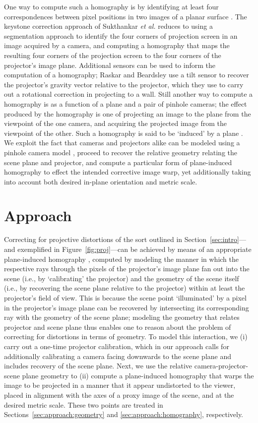 \documentclass[review]{elsarticle}
\begin{document}
One way to compute such a homography is by identifying at least four correspondences between pixel positions in two images of a planar surface \cite{Hartley2004}. The keystone correction approach of Sukthankar \textit{et al.} \cite{sukthankar2001smarter} reduces to using a segmentation approach to identify the four corners of projection screen in an image acquired by a camera, and computing a homography that maps the resulting four corners of the projection screen to the four corners of the projector's image plane. Additional sensors can be used to inform the computation of a homography; Raskar and Beardsley \cite{raskar2001self} use a tilt sensor to recover the projector's gravity vector relative to the projector, which they use to carry out a rotational correction in projecting to a wall. Still another way to compute a homography is as a function of a plane and a pair of pinhole cameras; the effect produced by the homography is one of projecting an image to the plane from the viewpoint of the one camera, and acquiring the projected image from the viewpoint of the other. Such a homography is said to be `induced' by a plane \cite{Hartley2004}. We exploit the fact that cameras and projectors alike can be modeled using a pinhole camera model \cite{bimber2019spatial}, proceed to recover the relative geometry relating the scene plane and projector, and compute a particular form of plane-induced homography to effect the intended corrective image warp, yet additionally taking into account both desired in-plane orientation and metric scale.

\section{Approach}

Correcting for projective distortions of the sort outlined in Section~\ref{sec:intro}---and exemplified in Figure~\ref{fig:proj}---can be achieved by means of an appropriate plane-induced homography \cite{Hartley2004}, computed by modeling the manner in which the respective rays through the pixels of the projector's image plane fan out into the scene (i.e., by `calibrating' the projector) and the geometry of the scene itself (i.e., by recovering the scene plane relative to the projector) within at least the projector's field of view. This is because the scene point `illuminated' by a pixel in the projector's image plane can be recovered by intersecting its corresponding ray with the geometry of the scene plane; modeling the geometry that relates projector and scene plane thus enables one to reason about the problem of correcting for distortions in terms of geometry. To model this interaction, we (i) carry out a one-time projector calibration, which in our approach calls for additionally calibrating a camera facing downwards to the scene plane and includes recovery of the scene plane. Next, we use the relative camera-projector-scene plane geometry to (ii) compute a plane-induced homography that warps the image to be projected in a manner that it appear undistorted to the viewer, placed in alignment with the axes of a proxy image of the scene, and at the desired metric scale. These two points are treated in Sections~\ref{sec:approach:geometry} and \ref{sec:approach:homography}, respectively.
\end{document}
